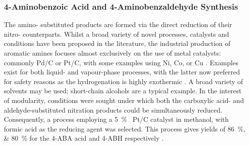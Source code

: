\subsubsection{4-Aminobenzoic Acid and 4-Aminobenzaldehyde Synthesis}
The amino- substituted products are formed via the direct reduction of their nitro- counterparts.
Whilst a broad variety of novel processes, catalysts and conditions have been proposed in the literature, the industrial production of aromatic amines focuses almost exclusively on the use of metal catalysts: commonly Pd/C or Pt/C, with some examples using Ni, Co, or Cu \cite{vogt_amines_2000,cartolano_amines_2004}.
Examples exist for both liquid- and vapour-phase processes, with the latter now preferred for safety reasons as the hydrogenation is highly exothermic \cite{vogt_amines_2000}.
A broad variety of solvents may be used; short-chain alcohols are a typical example.
In the interest of modularity, conditions were sought under which both the carboxylic acid- and aldehyde-substituted nitration products could be simultaneously reduced.
Consequently, a process employing a \SI{5}{\percent\ww} Pt/C catalyst in methanol, with formic acid as the reducing agent was selected.
This process gives yields of \SIlist{86;80}{\percent} for the 4-ABA acid and 4-ABH respectively \cite{gowda_catalytic_2000}.



